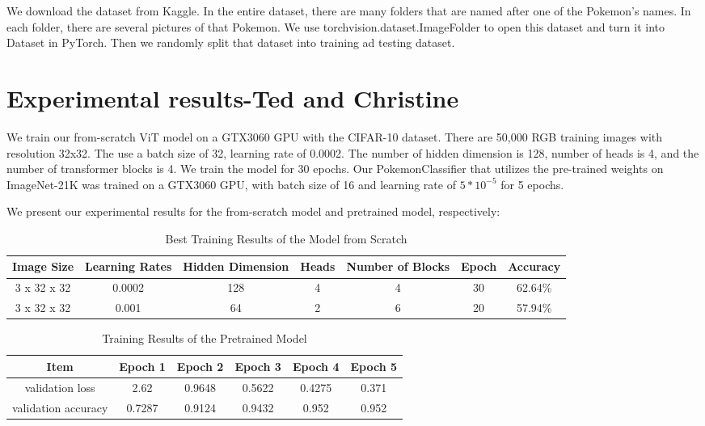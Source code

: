 \documentclass{article} %
\begin{document}
We download the dataset from Kaggle. In the entire dataset, there are many folders that 
are named after one of the Pokemon's names. In each folder, there are several pictures 
of that Pokemon. We use torchvision.dataset.ImageFolder to open this dataset and turn it 
into Dataset in PyTorch. Then we randomly split that dataset into training ad testing 
dataset.


\section{Experimental results-Ted and Christine}
\label{headings}
We train our from-scratch ViT model on a GTX3060 GPU with the CIFAR-10 dataset. There are 50,000 RGB training images
with resolution 32x32. The use a batch size of 32, learning rate of 0.0002. The number of hidden dimension is 128,
number of heads is 4, and the number of transformer blocks is 4. We train the model for 30 epochs. Our PokemonClassifier
that utilizes the pre-trained weights on ImageNet-21K was trained on a GTX3060 GPU, with batch size of 16 and learning 
rate of $5 * 10^{-5}$ for 5 epochs. 

We present our experimental results for the from-scratch model and pretrained model, respectively:


\begin{table}[ht]
  \centering
    \begin{tabular}{ c | c | c | c | c  | c | c }
      \hline
      Image Size & Learning Rates & Hidden Dimension & Heads & Number of Blocks & Epoch & Accuracy \\ \hline
      3 x 32 x 32 & 0.0002 & 128 & 4 & 4 & 30 & 62.64\% \\ \hline
      3 x 32 x 32 & 0.001 & 64 & 2 & 6 & 20 & 57.94\% \\ \hline
    \end{tabular}
    \caption{Best Training Results of the Model from Scratch}
  \label{tab:my_label}
\end{table}


\begin{table}[ht]
  \centering
    \begin{tabular}{ c | c | c | c | c  | c }
      \hline
      Item & Epoch 1 & Epoch 2 & Epoch 3 & Epoch 4 & Epoch 5 \\ \hline
      validation loss & 2.62 & 0.9648 & 0.5622 & 0.4275 & 0.371\\ \hline
      validation accuracy & 0.7287  & 0.9124 & 0.9432 & 0.952 & 0.952 \\ \hline
    \end{tabular}
    \caption{Training Results of the Pretrained Model}
  \label{tab:my_label}
\end{table}
\end{document}

